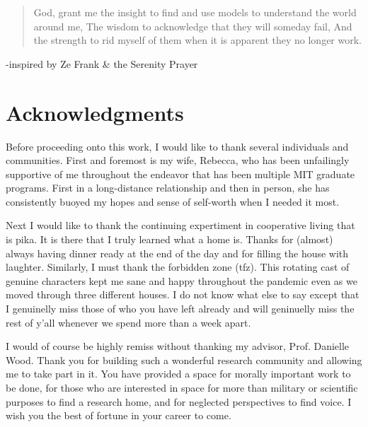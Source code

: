 % 

\clearpage
\hspace{0pt}
\vfill
\blockquote{\footnotesize
 God, grant me the insight to find and use models to understand the world around me, \newline The wisdom to acknowledge that they will someday fail, \newline And the strength to rid myself of them when it is apparent they no longer work.}

\hspace{50mm}-inspired by Ze Frank \& the Serenity Prayer
\normalsize
\vfill
\hspace{0pt}
\cleardoublepage

\section*{Acknowledgments}

Before proceeding onto this work, I would like to thank several individuals and communities. First and foremost is my wife, Rebecca, who has been unfailingly supportive of me throughout the endeavor that has been multiple MIT graduate programs. First in a long-distance relationship and then in person, she has consistently buoyed my hopes and sense of self-worth when I needed it most.

Next I would like to thank the continuing expertiment in cooperative living that is pika. It is there that I truly learned what a home is. Thanks for (almost) always having dinner ready at the end of the day and for filling the house with laughter. Similarly, I must thank the forbidden zone (tfz). This rotating cast of genuine characters kept me sane and happy throughout the pandemic even as we moved through three different houses. I do not know what else to say except that I genuinelly miss those of who you have left already and will geninuelly miss the rest of y'all whenever we spend more than a week apart.

I would of course be highly remiss without thanking my advisor, Prof. Danielle Wood. Thank you for building such a wonderful research community and allowing me to take part in it. You have provided a space for morally important work to be done, for those who are interested in space for more than military or scientific purposes to find a research home, and for neglected perspectives to find voice. I wish you the best of fortune in your career to come.

